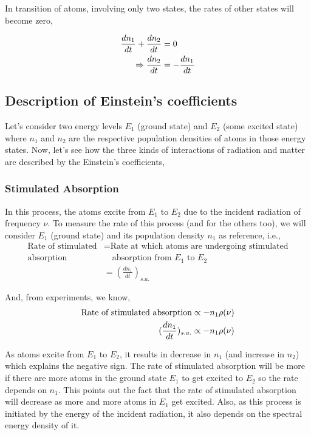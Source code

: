 \documentclass[12pt]{article}
\begin{document}
In transition of atoms, involving only two states, the rates of other states will become zero,

\begin{align}
    \frac{dn_{1}}{dt} + \frac{dn_{2}}{dt} & = 0 \notag \\
    \Rightarrow \frac{dn_{2}}{dt} & = -\frac{dn_{1}}{dt}
\end{align}

\subsection{Description of Einstein's coefficients}

Let's consider two energy levels $E_{1}$ (ground state) and $E_{2}$ (some excited state) where $n_{1}$ and $n_{2}$ are the respective population densities of atoms in those energy states. Now, let's see how the three kinds of interactions of radiation and matter are described by the Einstein's coefficients,

\subsubsection{Stimulated Absorption}

In this process, the atoms excite from $E_{1}$ to $E_{2}$ due to the incident radiation of frequency $\nu$. To measure the rate of this process (and for the others too), we will consider $E_{1}$ (ground state) and its population density $n_{1}$ as reference, i.e.,
\begin{align*}
    \text{Rate of stimulated} & = \text{Rate at which atoms are undergoing stimulated} \\
    \text{absorption} & \quad \text{absorption from } E_{1} \text{ to } E_{2} \\ 
    & = (\frac{dn_{1}}{dt})_{s.a.}
\end{align*}

And, from experiments, we know, 
\begin{align*}
    \textnormal{Rate of stimulated absorption} \propto -n_{1}\rho(\nu) \\ 
    (\frac{dn_{1}}{dt})_{s.a.} \propto -n_{1}\rho(\nu)
\end{align*}

As atoms excite from $E_{1}$ to $E_{2}$, it results in decrease in $n_{1}$ (and increase in $n_{2}$) which explains the negative sign. The rate of stimulated absorption will be more if there are more atoms in the ground state $E_{1}$ to get excited to $E_{2}$ so the rate depends on $n_{1}$. This points out the fact that the rate of stimulated absorption will decrease as more and more atoms in $E_{1}$ get excited. Also, as this process is initiated by the energy of the incident radiation, it also depends on the spectral energy density of it. \vspace{.2cm}
\end{document}

